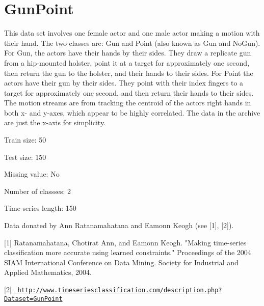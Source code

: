 \chapter{Gun\+Point}
\hypertarget{md_external_2data_2UCRArchive__2018_2GunPoint_2README}{}\label{md_external_2data_2UCRArchive__2018_2GunPoint_2README}
\label{md_external_2data_2UCRArchive__2018_2GunPoint_2README_autotoc_md103}%
%
 This data set involves one female actor and one male actor making a motion with their hand. The two classes are\+: Gun and Point (also known as Gun and No\+Gun). For Gun, the actors have their hands by their sides. They draw a replicate gun from a hip-\/mounted holster, point it at a target for approximately one second, then return the gun to the holster, and their hands to their sides. For Point the actors have their gun by their sides. They point with their index fingers to a target for approximately one second, and then return their hands to their sides. The motion streams are from tracking the centroid of the actor\textquotesingle{}s right hands in both x-\/ and y-\/axes, which appear to be highly correlated. The data in the archive are just the x-\/axis for simplicity.

Train size\+: 50

Test size\+: 150

Missing value\+: No

Number of classses\+: 2

Time series length\+: 150

Data donated by Ann Ratanamahatana and Eamonn Keogh (see \mbox{[}1\mbox{]}, \mbox{[}2\mbox{]}).

\mbox{[}1\mbox{]} Ratanamahatana, Chotirat Ann, and Eamonn Keogh. "{}\+Making time-\/series classification more accurate using learned constraints."{} Proceedings of the 2004 SIAM International Conference on Data Mining. Society for Industrial and Applied Mathematics, 2004.

\mbox{[}2\mbox{]} \href{http://www.timeseriesclassification.com/description.php?Dataset=GunPoint}{\texttt{ http\+://www.\+timeseriesclassification.\+com/description.\+php?\+Dataset=\+Gun\+Point}} 